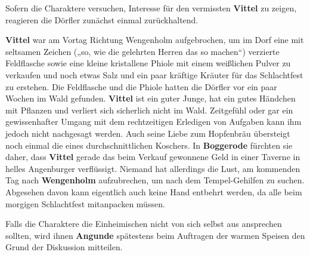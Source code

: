 Sofern die Charaktere versuchen, Interesse für den vermissten \textbf{Vittel} zu zeigen, reagieren die Dörfler zunächst einmal zurückhaltend.


\textbf{Vittel} war am Vortag Richtung Wengenholm aufgebrochen, um im Dorf eine mit seltsamen Zeichen („so, wie die gelehrten Herren das so machen“) verzierte Feldflasche sowie eine kleine kristallene Phiole mit einem weißlichen Pulver zu verkaufen und noch etwas Salz und ein paar kräftige Kräuter für das Schlachtfest zu erstehen.
Die Feldflasche und die Phiole hatten die Dörfler vor ein paar Wochen im Wald gefunden.
\textbf{Vittel} ist ein guter Junge, hat ein gutes Händchen mit Pflanzen und verliert sich sicherlich nicht im Wald.
Zeitgefühl oder gar ein gewissenhafter Umgang mit dem rechtzeitigen Erledigen von Aufgaben kann ihm jedoch nicht nachgesagt werden. 
Auch seine Liebe zum Hopfenbräu übersteigt noch einmal die eines durchschnittlichen Koschers.
In \textbf{Boggerode} fürchten sie daher, dass \textbf{Vittel} gerade das beim Verkauf gewonnene Geld in einer Taverne in helles Angenburger verflüssigt.
Niemand hat allerdings die Lust, am kommenden Tag nach \textbf{Wengenholm} aufzubrechen, um nach dem Tempel-Gehilfen zu suchen.
Abgesehen davon kann eigentlich auch keine Hand entbehrt werden, da alle beim morgigen Schlachtfest mitanpacken müssen.

Falls die Charaktere die Einheimischen nicht von sich selbst aus ansprechen sollten, wird ihnen \textbf{Angunde} spätestens beim Auftragen der warmen Speisen den Grund der Diskussion mitteilen.



